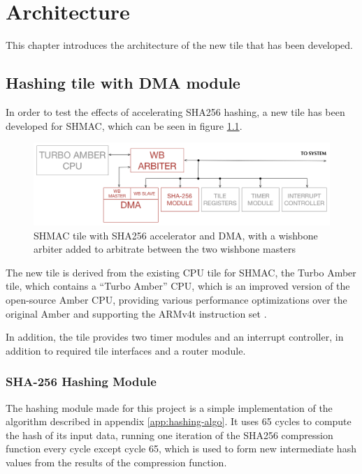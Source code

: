 \chapter{Architecture}
\label{cha:architecture}

This chapter introduces the architecture of the new tile that has been developed. 

\section{Hashing tile with DMA module}

In order to test the effects of accelerating SHA256 hashing, a new tile has been developed for
SHMAC, which can be seen in figure \ref{fig:SHA-Tile}.

\begin{figure}[htb]
    \centering
    \includegraphics[width=1.0\textwidth]{Figures/Tile/HashingTile}
    \caption{SHMAC tile with SHA256 accelerator and DMA, with a wishbone arbiter added to arbitrate between the two wishbone masters}
    \label{fig:SHA-Tile}
\end{figure}

The new tile is derived from the existing CPU tile for SHMAC, the Turbo Amber tile, which contains
a ``Turbo Amber'' CPU, which is an improved version of the open-source Amber CPU, providing various
performance optimizations over the original Amber and supporting the ARMv4t instruction set \cite{turboamber}.

In addition, the tile provides two timer modules and an interrupt controller, in addition to required
tile interfaces and a router module.

\subsection{SHA-256 Hashing Module}

The hashing module made for this project is a simple implementation of the algorithm described in
appendix \ref{app:hashing-algo}. It uses 65 cycles to compute the hash of its input data, running
one iteration of the SHA256 compression function every cycle except cycle 65, which is used to
form new intermediate hash values from the results of the compression function.

